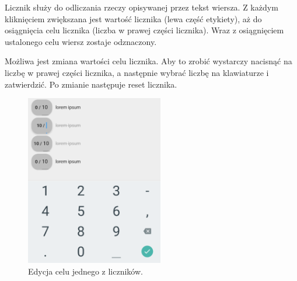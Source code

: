 Licznik służy do odliczania rzeczy opisywanej przez tekst wiersza. Z każdym kliknięciem zwiększana jest wartość licznika (lewa część etykiety), aż do osiągnięcia celu licznika (liczba w prawej części licznika). Wraz z osiągnięciem ustalonego celu wiersz zostaje odznaczony.

Możliwa jest zmiana wartości celu licznika. Aby to zrobić wystarczy nacisnąć na liczbę w prawej części licznika, a następnie wybrać liczbę na klawiaturze i zatwierdzić. Po zmianie następuje reset licznika.


\begin{figure}[ht]
    \centering
    \includegraphics[width=6cm]{images/liczniki.png}
    \caption{Edycja celu jednego z liczników.}
    \vspace{3mm}
\end{figure}